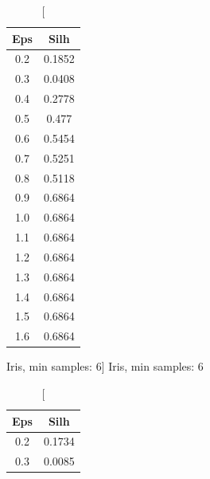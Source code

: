 \documentclass{classrep}
\begin{document}
{{{                \begin{table}[!htbp]
                    \begin{minipage}{.24\textwidth}
                        \centering
                        \begin{tabular}{|c|c|}
                            \hline
                            Eps & Silh \\ \hline
                            0.2 & 0.1852 \\ \hline
                            0.3 & 0.0408 \\ \hline
                            0.4 & 0.2778 \\ \hline
                            0.5 & 0.477 \\ \hline
                            0.6 & 0.5454 \\ \hline
                            0.7 & 0.5251 \\ \hline
                            0.8 & 0.5118 \\ \hline
                            0.9 & 0.6864 \\ \hline
                            1.0 & 0.6864 \\ \hline
                            1.1 & 0.6864 \\ \hline
                            1.2 & 0.6864 \\ \hline
                            1.3 & 0.6864 \\ \hline
                            1.4 & 0.6864 \\ \hline
                            1.5 & 0.6864 \\ \hline
                            1.6 & 0.6864 \\ \hline
                        \end{tabular}
                        \caption
                        [Iris, min samples: 6]
                        {Iris, min samples: 6}
                        \label{db_scan_table_Iris_eucl_min_sample6}
                    \end{minipage}
                    \hfill
                    \begin{minipage}{.24\textwidth}
                        \centering
                        \begin{tabular}{|c|c|}
                            \hline
                            Eps & Silh \\ \hline
                            0.2 & 0.1734 \\ \hline
                            0.3 & 0.0085 \\ \hline

\end{tabular}
\end{minipage}
\end{table}}}}
\end{document}
